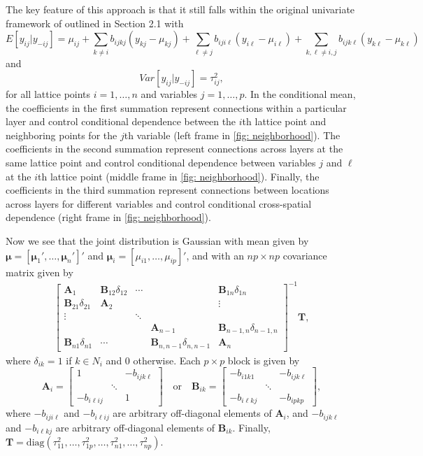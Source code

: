 \documentclass[12pt]{amsart}
\begin{document}
The key feature of this approach is that it still falls within the original univariate framework of \cite{besag} outlined in Section 2.1 with
$$E[y_{ij} | y_{-ij}] = \mu_{ij} + \sum_{k \neq i} b_{ijkj} (y_{kj}-\mu_{kj}) +  \sum_{\ell \neq j} b_{iji\ell} (y_{i \ell}-\mu_{i \ell}) + \sum_{k,\ell \neq i,j} b_{ijk\ell} (y_{k\ell}-\mu_{k\ell})$$
and
$$Var[y_{ij} | y_{-ij}] = \tau_{ij}^2,$$
for all lattice points $i = 1, \dots,n$ and variables $j = 1, \dots,p$. In the conditional mean, the coefficients in the first summation represent connections within a particular layer and control conditional dependence between the $i$th lattice point and neighboring points for the $j$th variable (left frame in \ref{fig: neighborhood}). The coefficients in the
second summation represent connections across layers at the same lattice point and control conditional dependence between variables $j$ and $\ell$ at the $i$th lattice point (middle frame in \ref{fig: neighborhood}). Finally, the coefficients in the third summation represent connections between locations across layers for different variables and control conditional cross-spatial dependence (right frame in \ref{fig: neighborhood}). 

Now we see that the joint distribution is Gaussian with mean given by $\boldsymbol{\mu} = [\boldsymbol{\mu}_1' , \dots, \boldsymbol{\mu}_n']'$ and $\boldsymbol{\mu}_i = [\mu_{i1}, \dots, \mu_{ip}]'$, and with an $np \times np$ covariance matrix given by
\begin{eqnarray*}
    \begin{bmatrix}
        \boldsymbol{A}_1 & \boldsymbol{B}_{12} \delta_{12} & \cdots & & \boldsymbol{B}_{1n}\delta_{1n} \\
        \boldsymbol{B}_{21}\delta_{21} & \boldsymbol{A}_2 & & & \vdots \\
        \vdots & & \ddots &  & \\
        & & & \boldsymbol{A}_{n-1} & \boldsymbol{B}_{n-1, n}\delta_{n-1, n} \\
        \boldsymbol{B}_{n1}\delta_{n1} & \cdots &  & \boldsymbol{B}_{n, n-1}\delta_{n, n-1} &  \boldsymbol{A}_n
    \end{bmatrix}^{-1} \boldsymbol{T},
\end{eqnarray*}
where $\delta_{ik} =1$ if $k \in N_i$ and 0 otherwise. Each $p\times p$ block is given by
$$
    \boldsymbol{A}_i = \begin{bmatrix}
        1 &  & -b_{ijk\ell} \\
         & \ddots  &  \\
        -b_{i\ell ij} &  & 1 
    \end{bmatrix} \quad \text{or} \quad
    \boldsymbol{B}_{ik} = \begin{bmatrix}
        -b_{i1k1} &  & -b_{ijk\ell} \\
         & \ddots  &  \\
        -b_{i\ell kj} &  & -b_{ipkp}
    \end{bmatrix},
$$
where $-b_{iji\ell}$ and $-b_{i\ell ij}$ are arbitrary off-diagonal elements of $\boldsymbol{A}_i$, and $-b_{ijk\ell}$ and $-b_{i\ell kj}$ are arbitrary off-diagonal elements of $\boldsymbol{B}_{ik}$. Finally, $\boldsymbol{T} = \text{diag}(\tau_{11}^2, \dots, \tau_{1p}^2, \dots, \tau_{n1}^2, \dots, \tau_{np}^2)$. 
\end{document}
